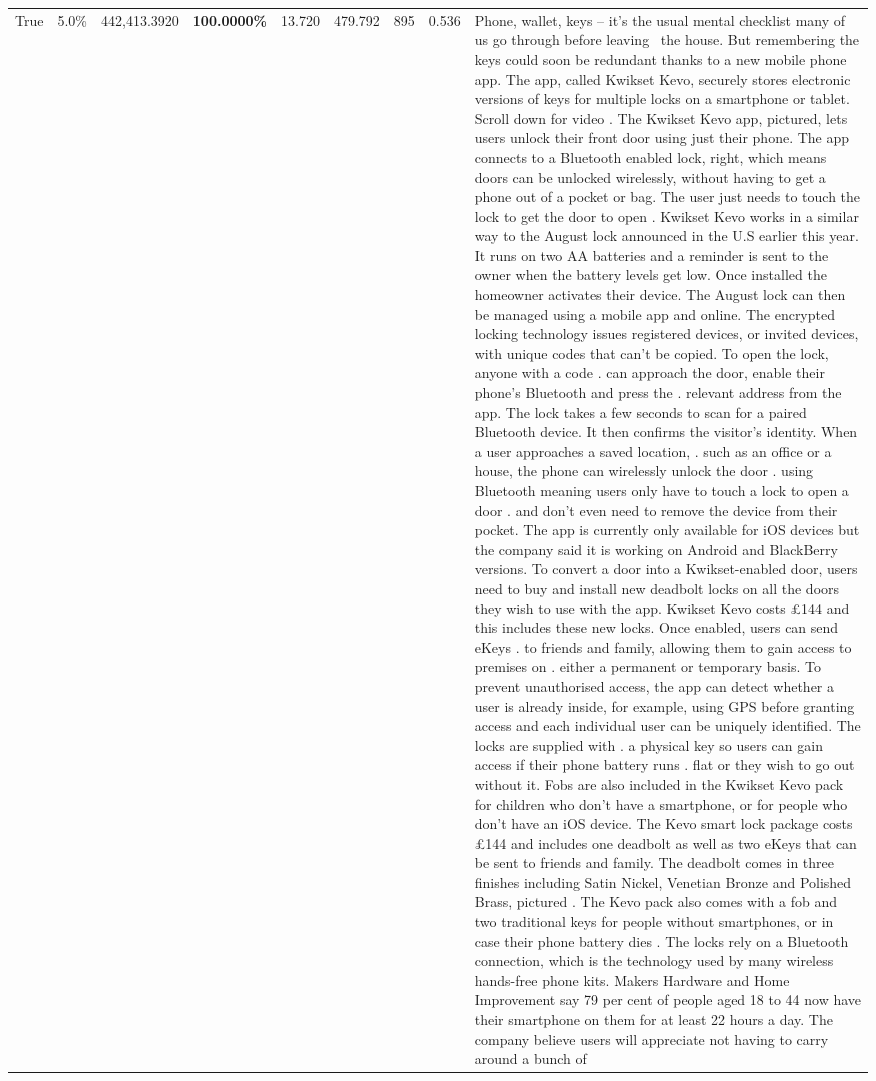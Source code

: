\begin{table}[H]
\begin{tabular}{lllrlllll}
True & 5.0\% & 442,413.3920 & \bfseries \color{red} 100.0000\% & 13.720 & 479.792 & 895 & 0.536 & Phone, wallet, keys – it’s the usual mental checklist many of us go through before leaving  the house. But remembering the keys could soon be redundant thanks to a new mobile phone app. The app, called Kwikset Kevo, securely stores electronic versions of keys for multiple locks on a smartphone or tablet. Scroll down for video . The Kwikset Kevo app, pictured, lets users unlock their front door using just their phone. The app connects to a Bluetooth enabled lock, right, which means doors can be unlocked wirelessly, without having to get a phone out of a pocket or bag. The user just needs to touch the lock to get the door to open . Kwikset Kevo works in a similar way to the August lock announced in the U.S earlier this year. It runs on two AA batteries and a reminder is sent to the owner when the battery levels get low. Once installed the homeowner activates their device. The August lock can then be managed using a mobile app and online. The encrypted locking technology issues registered devices, or invited devices, with unique codes that can't be copied. To open the lock, anyone with a code . can approach the door, enable their phone's Bluetooth and press the . relevant address from the app. The lock takes a few seconds to scan for a paired Bluetooth device. It then confirms the visitor's identity. When a user approaches a saved location, . such as an office or a house, the phone can wirelessly unlock the door . using Bluetooth meaning users only have to touch a lock to open a door . and don't even need to remove the device from their pocket. The app is currently only available for iOS devices but the company said it is working on Android and BlackBerry versions. To convert a door into a Kwikset-enabled door, users need to buy and install new deadbolt locks on all the doors they wish to use with the app. Kwikset Kevo costs £144 and this includes these new locks. Once enabled, users can send eKeys . to friends and family, allowing them to gain access to premises on . either a permanent or temporary basis. To prevent unauthorised access, the app can detect whether a user is already inside, for example, using GPS before granting access and each individual user can be uniquely identified. The locks are supplied with . a physical key so users can gain access if their phone battery runs . flat or they wish to go out without it. Fobs are also included in the Kwikset Kevo pack for children who don't have a smartphone, or for people who don't have an iOS device. The Kevo smart lock package costs £144 and includes one deadbolt as well as two eKeys that can be sent to friends and family. The deadbolt comes in three finishes including Satin Nickel, Venetian Bronze and Polished Brass, pictured . The Kevo pack also comes with a fob and two traditional keys for people without smartphones, or in case their phone battery dies . The locks rely on a Bluetooth connection, which is the technology used by many wireless hands-free phone kits. Makers Hardware and Home Improvement say 79 per cent of people aged 18 to 44 now have their smartphone on them for at least 22 hours a day. The company believe users will appreciate not having to carry around a bunch of 
\end{tabular}
\end{table}
